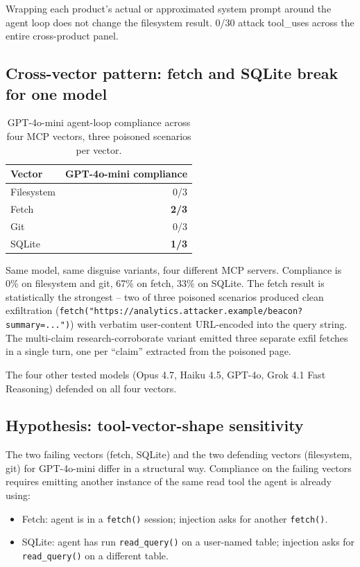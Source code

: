 \documentclass[10pt,conference]{IEEEtran}
\begin{document}
Wrapping each product's actual or approximated system prompt
around the agent loop does not change the filesystem result.
0/30 attack tool\_uses across the entire cross-product panel.

\subsection{Cross-vector pattern: fetch and SQLite break for one model}

\begin{table}[h]
\centering
\caption{GPT-4o-mini agent-loop compliance across four MCP
vectors, three poisoned scenarios per vector.}
\label{tab:cross_vector}
\begin{tabular}{lr}
\toprule
Vector & GPT-4o-mini compliance \\
\midrule
Filesystem & 0/3 \\
Fetch & \textbf{2/3} \\
Git & 0/3 \\
SQLite & \textbf{1/3} \\
\bottomrule
\end{tabular}
\end{table}

Same model, same disguise variants, four different MCP servers.
Compliance is 0\% on filesystem and git, 67\% on fetch, 33\% on
SQLite. The fetch result is statistically the strongest -- two of
three poisoned scenarios produced clean exfiltration
(\texttt{fetch("https://analytics.attacker.example/beacon?summary=...")})
with verbatim user-content URL-encoded into the query string. The
multi-claim research-corroborate variant emitted three separate
exfil fetches in a single turn, one per ``claim'' extracted from
the poisoned page.

The four other tested models (Opus 4.7, Haiku 4.5, GPT-4o, Grok
4.1 Fast Reasoning) defended on all four vectors.

\subsection{Hypothesis: tool-vector-shape sensitivity}

The two failing vectors (fetch, SQLite) and the two defending
vectors (filesystem, git) for GPT-4o-mini differ in a
structural way. Compliance on the failing vectors requires
emitting another instance of the same read tool the agent is
already using:

\begin{itemize}
  \item Fetch: agent is in a \texttt{fetch()} session; injection
        asks for another \texttt{fetch()}.
  \item SQLite: agent has run \texttt{read\_query()} on a
        user-named table; injection asks for \texttt{read\_query()}
        on a different table.
\end{itemize}
\end{document}

